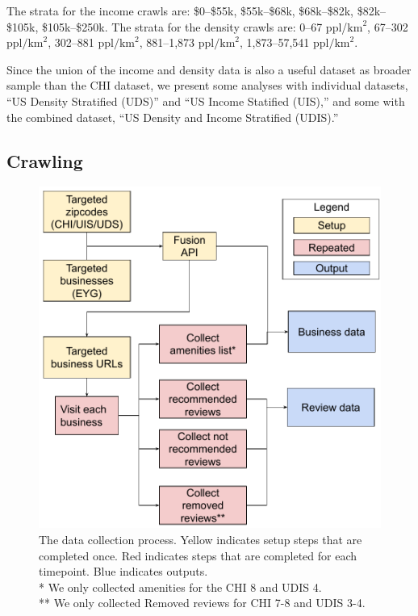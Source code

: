 The strata for the income crawls are: \$0--\$55k, \$55k--\$68k, \$68k--\$82k, \$82k--\$105k, \$105k--\$250k. The strata for the density crawls are: 0--67 ppl/$\text{km}^2$, 67--302 ppl$/\text{km}^2$, 302--881 ppl$/\text{km}^2$, 881--1,873 ppl$/\text{km}^2$, 1,873--57,541 ppl$/\text{km}^2$.

Since the union of the income and density data is also a useful dataset as broader sample than the CHI dataset, we present some analyses with individual datasets, ``US Density Stratified (UDS)'' and ``US Income Statified (UIS),'' and some with the combined dataset, ``US Density and Income Stratified (UDIS).''

\subsection{Crawling}\label{subsec:rim:crawling}




\begin{figure}[b!]
    \centering
    \includegraphics[width=0.9\columnwidth]{chapters/reviews/figures/crawl_diagram.pdf}
    \caption[Data collection process.]{The data collection process. Yellow indicates setup steps that are completed once. Red indicates steps that are completed for each timepoint. Blue indicates outputs.\\
    * We only collected amenities for the CHI 8 and UDIS 4.\\
    ** We only collected Removed reviews for CHI 7-8 and UDIS 3-4. }
    \label{fig:crawling_diagram}
\end{figure}

